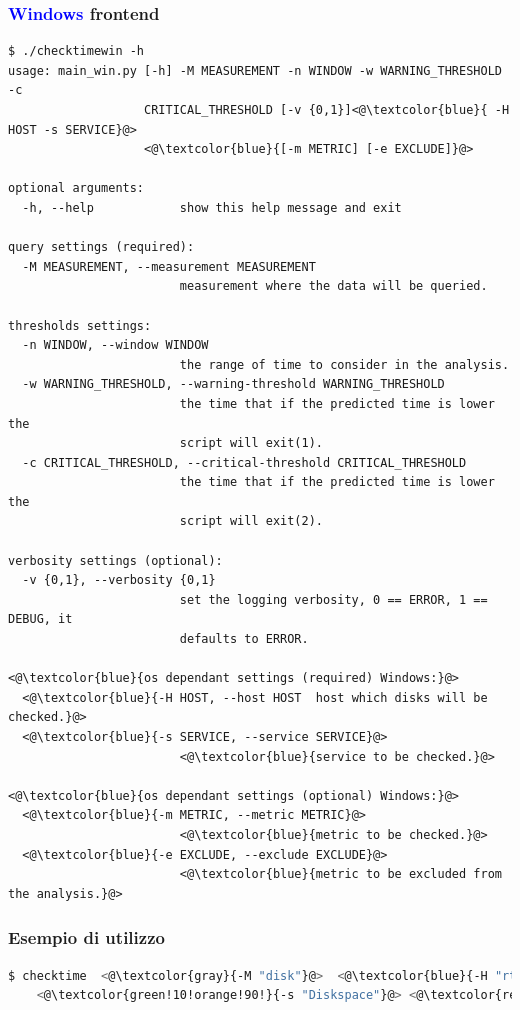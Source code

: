 \documentclass{article}
\begin{document}
\subsubsection*{\textcolor{blue}{Windows} frontend}
\begin{lstlisting}[]
$ ./checktimewin -h
usage: main_win.py [-h] -M MEASUREMENT -n WINDOW -w WARNING_THRESHOLD -c
                   CRITICAL_THRESHOLD [-v {0,1}]<@\textcolor{blue}{ -H HOST -s SERVICE}@>
                   <@\textcolor{blue}{[-m METRIC] [-e EXCLUDE]}@>

optional arguments:
  -h, --help            show this help message and exit

query settings (required):
  -M MEASUREMENT, --measurement MEASUREMENT
                        measurement where the data will be queried.

thresholds settings:
  -n WINDOW, --window WINDOW
                        the range of time to consider in the analysis.
  -w WARNING_THRESHOLD, --warning-threshold WARNING_THRESHOLD
                        the time that if the predicted time is lower the
                        script will exit(1).
  -c CRITICAL_THRESHOLD, --critical-threshold CRITICAL_THRESHOLD
                        the time that if the predicted time is lower the
                        script will exit(2).

verbosity settings (optional):
  -v {0,1}, --verbosity {0,1}
                        set the logging verbosity, 0 == ERROR, 1 == DEBUG, it
                        defaults to ERROR.

<@\textcolor{blue}{os dependant settings (required) Windows:}@>
  <@\textcolor{blue}{-H HOST, --host HOST  host which disks will be checked.}@>
  <@\textcolor{blue}{-s SERVICE, --service SERVICE}@>
                        <@\textcolor{blue}{service to be checked.}@>

<@\textcolor{blue}{os dependant settings (optional) Windows:}@>
  <@\textcolor{blue}{-m METRIC, --metric METRIC}@>
                        <@\textcolor{blue}{metric to be checked.}@>
  <@\textcolor{blue}{-e EXCLUDE, --exclude EXCLUDE}@>
                        <@\textcolor{blue}{metric to be excluded from the analysis.}@>

\end{lstlisting}
\clearpage
\subsubsection*{Esempio di utilizzo}

\begin{lstlisting}[language=Bash]
$ checktime  <@\textcolor{gray}{-M "disk"}@>  <@\textcolor{blue}{-H "rt-sccm01-p1.idolrt.regione.toscana.it"}@> 
    <@\textcolor{green!10!orange!90!}{-s "Diskspace"}@> <@\textcolor{red}{-m "C:/"}@> <@\textcolor{green!20!blue!80!}{-n "1d"}@> <@\textcolor{black!30!green!70!}{-w "4w"}@> <@\textcolor{black!30!magenta!70!}{-c "1w"}@>
\end{lstlisting}
\end{document}
